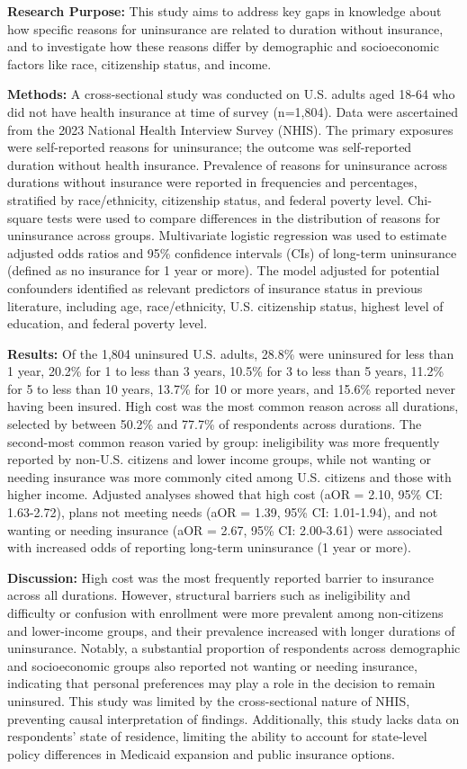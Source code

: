 \documentclass[12pt]{article}
\begin{document}
\textbf{Research Purpose:} This study aims to address key gaps in knowledge about how specific reasons for uninsurance are related to duration without insurance, and to investigate how these reasons differ by demographic and socioeconomic factors like race, citizenship status, and income.

\textbf{Methods:} A cross-sectional study was conducted on U.S. adults aged 18-64 who did not have health insurance at time of survey (n=1,804). Data were ascertained from the 2023 National Health Interview Survey (NHIS). The primary exposures were self-reported reasons for uninsurance; the outcome was self-reported duration without health insurance. Prevalence of reasons for uninsurance across durations without insurance were reported in frequencies and percentages, stratified by race/ethnicity, citizenship status, and federal poverty level. Chi-square tests were used to compare differences in the distribution of reasons for uninsurance across groups. Multivariate logistic regression was used to estimate adjusted odds ratios and 95\% confidence intervals (CIs) of long-term uninsurance (defined as no insurance for 1 year or more). The model adjusted for potential confounders identified as relevant predictors of insurance status in previous literature, including age, race/ethnicity, U.S. citizenship status, highest level of education, and federal poverty level.

\textbf{Results:} Of the 1,804 uninsured U.S. adults, 28.8\% were uninsured for less than 1 year, 20.2\% for 1 to less than 3 years, 10.5\% for 3 to less than 5 years, 11.2\% for 5 to less than 10 years, 13.7\% for 10 or more years, and 15.6\% reported never having been insured. High cost was the most common reason across all durations, selected by between 50.2\% and 77.7\% of respondents across durations. The second-most common reason varied by group: ineligibility was more frequently reported by non-U.S. citizens and lower income groups, while not wanting or needing insurance was more commonly cited among U.S. citizens and those with higher income. Adjusted analyses showed that high cost (aOR = 2.10, 95\% CI: 1.63-2.72), plans not meeting needs (aOR = 1.39, 95\% CI: 1.01-1.94), and not wanting or needing insurance (aOR = 2.67, 95\% CI: 2.00-3.61) were associated with increased odds of reporting long-term uninsurance (1 year or more).

\textbf{Discussion:} High cost was the most frequently reported barrier to insurance across all durations. However, structural barriers such as ineligibility and difficulty or confusion with enrollment were more prevalent among non-citizens and lower-income groups, and their prevalence increased with longer durations of uninsurance. Notably, a substantial proportion of respondents across demographic and socioeconomic groups also reported not wanting or needing insurance, indicating that personal preferences may play a role in the decision to remain uninsured. This study was limited by the cross-sectional nature of NHIS, preventing causal interpretation of findings. Additionally, this study lacks data on respondents’ state of residence, limiting the ability to account for state-level policy differences in Medicaid expansion and public insurance options.
\end{document}
